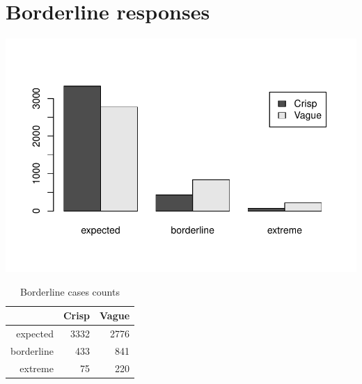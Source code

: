 \documentclass[a4paper,12pt]{article}\usepackage[]{graphicx}\usepackage[]{color}
\makeatletter
\def\maxwidth{ %
  \ifdim\Gin@nat@width>\linewidth
    \linewidth
  \else
    \Gin@nat@width
  \fi
}
\newenvironment{knitrout}{}{} %
\makeatother
\begin{document}
\clearpage
\section{Borderline responses}

\begin{knitrout}\scriptsize
{}\color{fgcolor}

{\centering \includegraphics[width=\maxwidth]{figure/graphics-barplotBorderline-1} 

}



\end{knitrout}

\begin{table}[htbp]
\centering
\begingroup\small
\begin{tabular}{rrr}
  \hline
 & Crisp & Vague \\ 
  \hline
expected & 3332 & 2776 \\ 
  borderline & 433 & 841 \\ 
  extreme &  75 & 220 \\ 
   \hline
\end{tabular}
\endgroup
\caption{Borderline cases counts} 
\end{table}
\end{document}
